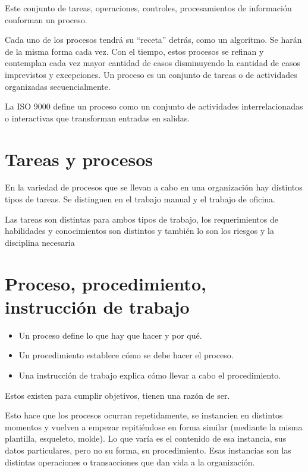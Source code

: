 \documentclass[titlepage,a4paper]{article}
\begin{document}
Este conjunto de tareas, operaciones, controles, procesamientos de información conforman un proceso.

Cada uno de los procesos tendrá su “receta” detrás, como un algoritmo. Se harán de
la misma forma cada vez. Con el tiempo, estos procesos se refinan y contemplan cada vez mayor
cantidad de casos disminuyendo la cantidad de casos imprevistos y excepciones. Un proceso es un conjunto de tareas o de actividades organizadas secuencialmente.

La ISO 9000 define un proceso como un conjunto de actividades interrelacionadas o interactivas que
transforman entradas en salidas.

\section{Tareas y procesos}

En la variedad de procesos que se llevan a cabo en una organización hay distintos tipos de tareas. Se distinguen en el trabajo manual y el trabajo de oficina.

Las tareas son distintas para ambos tipos de trabajo, los requerimientos de habilidades y
conocimientos son distintos y también lo son los riesgos y la disciplina necesaria

\section{Proceso, procedimiento, instrucción de trabajo}

   
\begin{itemize}
   	\item Un proceso define lo que hay que hacer y por qué.
    \item Un procedimiento establece cómo se debe hacer el proceso. 
    \item Una instrucción de trabajo explica cómo llevar a cabo el procedimiento.
\end{itemize}

Estos existen para cumplir objetivos, tienen una razón de ser.

Esto hace que los procesos ocurran repetidamente, se instancien en distintos momentos y vuelven a
empezar repitiéndose en forma similar (mediante la misma plantilla, esqueleto, molde). Lo que varía
es el contenido de esa instancia, sus datos particulares, pero no su forma, su procedimiento. Esas
instancias son las distintas operaciones o transacciones que dan vida a la organización.
\end{document}

